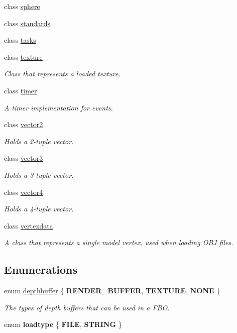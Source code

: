 \begin{DoxyCompactItemize}
class \hyperlink{classflounder_1_1sphere}{sphere}
\item 
class \hyperlink{classflounder_1_1standards}{standards}
\item 
class \hyperlink{classflounder_1_1tasks}{tasks}
\item 
class \hyperlink{classflounder_1_1texture}{texture}
\begin{DoxyCompactList}\small\item\em Class that represents a loaded texture. \end{DoxyCompactList}\item 
class \hyperlink{classflounder_1_1timer}{timer}
\begin{DoxyCompactList}\small\item\em A timer implementation for events. \end{DoxyCompactList}\item 
class \hyperlink{classflounder_1_1vector2}{vector2}
\begin{DoxyCompactList}\small\item\em Holds a 2-\/tuple vector. \end{DoxyCompactList}\item 
class \hyperlink{classflounder_1_1vector3}{vector3}
\begin{DoxyCompactList}\small\item\em Holds a 3-\/tuple vector. \end{DoxyCompactList}\item 
class \hyperlink{classflounder_1_1vector4}{vector4}
\begin{DoxyCompactList}\small\item\em Holds a 4-\/tuple vector. \end{DoxyCompactList}\item 
class \hyperlink{classflounder_1_1vertexdata}{vertexdata}
\begin{DoxyCompactList}\small\item\em A class that represents a single model vertex, used when loading O\+BJ files. \end{DoxyCompactList}\end{DoxyCompactItemize}
\subsection*{Enumerations}
\begin{DoxyCompactItemize}
\item 
enum \hyperlink{namespaceflounder_aed09c736167e783c910ec9e58479b57c}{depthbuffer} \{ {\bfseries R\+E\+N\+D\+E\+R\+\_\+\+B\+U\+F\+F\+ER}, 
{\bfseries T\+E\+X\+T\+U\+RE}, 
{\bfseries N\+O\+NE}
 \}\begin{DoxyCompactList}\small\item\em The types of depth buffers that can be used in a F\+BO. \end{DoxyCompactList}
\item 
\mbox{\label{namespaceflounder_a69b4e6ffcd64f6175546ca0942d18565}} 
enum {\bfseries loadtype} \{ {\bfseries F\+I\+LE}, 
{\bfseries S\+T\+R\+I\+NG}
 \}
\end{DoxyCompactItemize}

